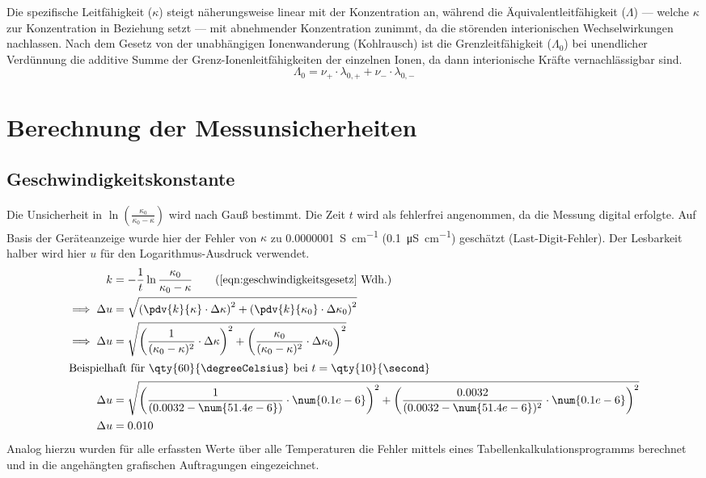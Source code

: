 Die spezifische Leitfähigkeit ($\kappa$) steigt näherungsweise linear mit der Konzentration an, während die Äquivalentleitfähigkeit ($\Lambda$) --- welche $\kappa$ zur Konzentration in Beziehung setzt --- mit abnehmender Konzentration zunimmt, da die störenden interionischen Wechselwirkungen nachlassen.
Nach dem Gesetz von der unabhängigen Ionenwanderung (Kohlrausch) ist die Grenzleitfähigkeit ($\Lambda_0$) bei unendlicher Verdünnung die additive Summe der Grenz-Ionenleitfähigkeiten der einzelnen Ionen, da dann interionische Kräfte vernachlässigbar sind.
\begin{equation}
\Lambda_0 = \nu_+ \cdot \lambda_{0,+} + \nu_- \cdot \lambda_{0,-}
\end{equation}

\newpage
\printbibliography
\newpage
\appendix

\section{Berechnung der Messunsicherheiten}
\subsection{Geschwindigkeitskonstante}
Die Unsicherheit in $\ln \left( \frac{\kappa_0}{\kappa_0 - \kappa} \right)$ wird nach Gauß bestimmt. Die Zeit $t$ wird als fehlerfrei angenommen, da die Messung digital erfolgte.
Auf Basis der Geräteanzeige wurde hier der Fehler von $\kappa$ zu \qty{0.0000001}{\siemens\per\cm} (\qty{0.1}{\micro\siemens\per\cm}) geschätzt (Last-Digit-Fehler).
Der Lesbarkeit halber wird hier $u$ für den Logarithmus-Ausdruck verwendet.
\begin{align*}
    k &= - \frac{1}{t} \ln \frac{\kappa_0}{\kappa_0 - \kappa} \tag{\ref{eqn:geschwindigkeitsgesetz} Wdh.} \\
    \implies \Delta u &= \sqrt{\left( \pdv{k}{\kappa} \cdot \Delta \kappa \right)^2 + \left( \pdv{k}{\kappa_0} \cdot \Delta \kappa_0 \right)^2} \\
    \implies \Delta u &= \sqrt{\left( \frac{1}{(\kappa_0 - \kappa)^2} \cdot \Delta \kappa \right)^2 + \left( \frac{\kappa_0}{(\kappa_0 - \kappa)^2} \cdot \Delta \kappa_0 \right)^2} \\
    \intertext{Beispielhaft für \qty{60}{\degreeCelsius} bei $t = \qty{10}{\second}$}
    \Delta u &= \sqrt{\left( \frac{1}{(0.0032 - \num{51.4e-6})} \cdot \num{0.1e-6} \right)^2
                            + \left( \frac{0.0032}{(0.0032 - \num{51.4e-6})^2} \cdot \num{0.1e-6} \right)^2 } \\
    \Delta u &= 0.010
\end{align*}
Analog hierzu wurden für alle erfassten Werte über alle Temperaturen die Fehler mittels eines Tabellenkalkulationsprogramms berechnet und in die angehängten grafischen Auftragungen eingezeichnet.


